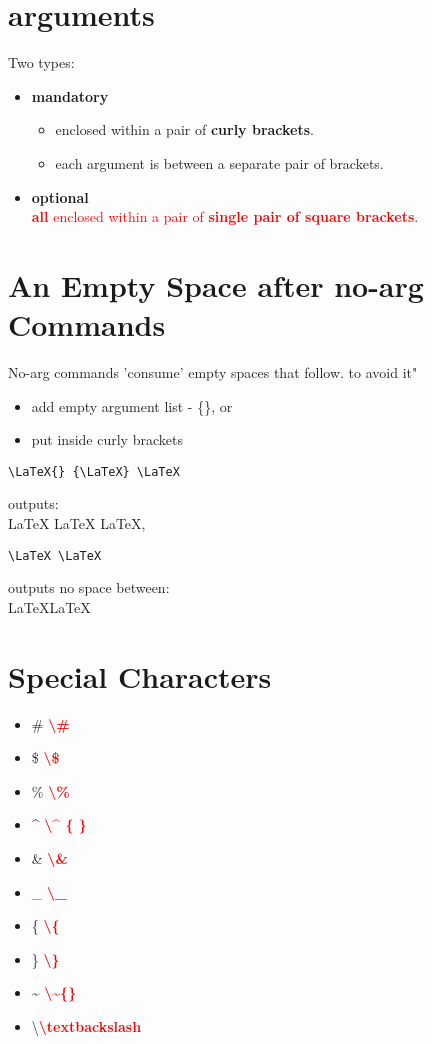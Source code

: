 \documentclass{report}
\begin{document}
\section{arguments}
Two types:
\begin{itemize}
	\item \textbf{mandatory}
	\begin{itemize}
		\item 	enclosed within a pair of \textbf{curly brackets}.
		\item each argument is between a separate pair of brackets.
	\end{itemize}

	\item \textbf{optional}\\
	\textcolor{red}{\textbf{all} enclosed within a pair of \textbf{single pair of square brackets}}.
\end{itemize}

\section{An Empty Space after no-arg Commands}
No-arg commands 'consume' empty spaces that follow. to avoid it"
\begin{itemize}
	\item add empty argument list - \{\}, or
	\item put inside curly brackets
\end{itemize} 
\begin{verbatim}
\LaTeX{} {\LaTeX} \LaTeX
\end{verbatim}
outputs:\\
\LaTeX{} {\LaTeX} \LaTeX,
\begin{verbatim}
\LaTeX \LaTeX
\end{verbatim}
outputs no space between:\\
\LaTeX \LaTeX

\section{Special Characters}
\begin{itemize}
	\item \#{} \textcolor{red}{\textbf{\textbackslash \#}}
	\item \${} \textbf{\textcolor{red}{ \textbackslash \$}}
	\item \%{} \textbf{\textcolor{red}{\textbackslash \%}}
	\item \^{} \textcolor{red}{\textbf{\textbackslash \^{} \{ \}}}
	\item \&{} \textbf{\textcolor{red}{\textbackslash \&}}
	\item \_{} \textbf{\textcolor{red}{\textbackslash \_}}
	\item \{{} \textbf{\textcolor{red}{\textbackslash \{}}
	\item \}{} \textbf{\textcolor{red}{\textbackslash \}}}
	\item  \~{} \textbf{\textcolor{red}{\textbackslash \~{}\{{}\}{}}} 
	\item \textbackslash \textbf{\textcolor{red}{\textbackslash textbackslash}}
\end{itemize}
\end{document}
